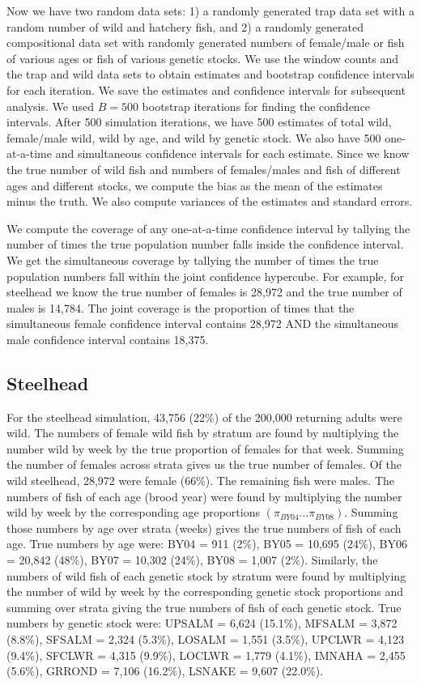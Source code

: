 \documentclass[12pt]{article}
\begin{document}
Now we have two random data sets: 1) a randomly generated trap data set with a random number of wild and hatchery fish, and 2) a randomly generated compositional data set with randomly generated numbers of female/male or fish of various ages or fish of various genetic stocks. We use the window counts and the trap and wild data sets to obtain estimates and bootstrap confidence intervals for each iteration. We save the estimates and confidence intervals for subsequent analysis. We used $B = 500$ bootstrap iterations for finding the confidence intervals. After 500 simulation iterations, we have 500 estimates of total wild, female/male wild, wild by age, and wild by genetic stock. We also have 500 one-at-a-time and simultaneous confidence intervals for each estimate. Since we know the true number of wild fish and numbers of females/males and fish of different ages and different stocks, we compute the bias as the mean of the estimates minus the truth. We also compute variances of the estimates and standard errors.

We compute the coverage of any one-at-a-time confidence interval by tallying the number of times the true population number falls inside the confidence interval. We get the simultaneous coverage by tallying the number of times the true population numbers fall within the joint confidence hypercube. For example, for steelhead we know the true number of females is 28,972 and the true number of males is 14,784. The joint coverage is the proportion of times that the simultaneous female confidence interval contains 28,972 AND the simultaneous male confidence interval contains 18,375.

\subsection{Steelhead}

For the steelhead simulation, 43,756 (22\%) of the 200,000 returning adults were wild. The numbers of female wild fish by stratum are found by multiplying the number wild by week by the true proportion of females for that week. Summing the number of females across strata gives us the true number of females. Of the wild steelhead, 28,972 were female (66\%). The remaining fish were males. The numbers of fish of each age (brood year) were found by multiplying the number wild by week by the corresponding age proportions $(\pi_{BY04}\ldots \pi_{BY08})$. Summing those numbers by age over strata (weeks) gives the true numbers of fish of each age. True numbers by age were: BY04 = 911 (2\%), BY05 = 10,695 (24\%), BY06 = 20,842 (48\%), BY07 = 10,302 (24\%), BY08 = 1,007 (2\%). Similarly, the numbers of wild fish of each genetic stock by stratum were found by multiplying the number of wild by week by the corresponding genetic stock proportions and summing over strata giving the true numbers of fish of each genetic stock. True numbers by genetic stock were: UPSALM = 6,624 (15.1\%), MFSALM = 3,872 (8.8\%), SFSALM = 2,324 (5.3\%), LOSALM = 1,551 (3.5\%), UPCLWR = 4,123 (9.4\%), SFCLWR = 4,315 (9.9\%), LOCLWR = 1,779 (4.1\%), IMNAHA = 2,455 (5.6\%), GRROND = 7,106 (16.2\%), LSNAKE = 9,607 (22.0\%).
\end{document}
